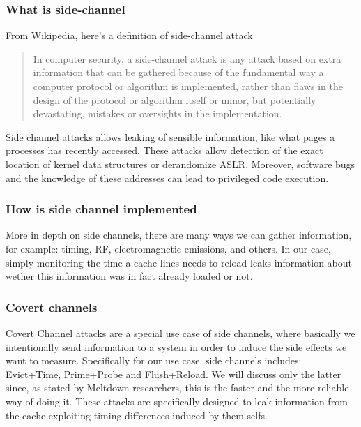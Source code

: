 \subsubsection{What is side-channel}
From Wikipedia, here's a definition of side-channel attack
\begin{quotation}
    In computer security, a side-channel attack is any attack based on extra
    information that can be gathered because of the fundamental way a computer
    protocol or algorithm is implemented, rather than flaws in the design of the
    protocol or algorithm itself or minor, but potentially devastating, mistakes
    or oversights in the implementation.
\end{quotation}
Side channel attacks allows leaking of sensible information, like what pages a processes has recently accessed. These attacks
allow detection of the exact location of kernel data structures or derandomize ASLR. Moreover, software bugs and the knowledge of these addresses
can lead to privileged code execution.

\subsubsection{How is side channel implemented}
More in depth on side channels, there are many ways we can gather information, for example: timing, RF, electromagnetic emissions, and others.
In our case, simply monitoring the time a cache lines needs to reload leaks information about wether this information was in fact already loaded or not.
\subsubsection{Covert channels}
Covert Channel attacks are a special use case of side channels, where basically we intentionally send information
to a system in order to induce the side effects we want to measure.
Specifically for our use case, side channels includes: Evict+Time, Prime+Probe and Flush+Reload. We will discuss only the latter since, as stated by
Meltdown researchers, this is the faster and the more reliable way of doing it.
These attacks are specifically designed to leak information from the cache exploiting timing differences induced by them selfs.

